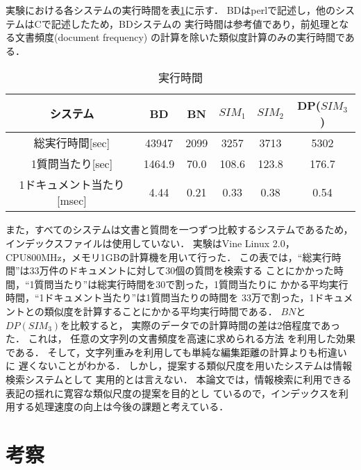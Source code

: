 実験における各システムの実行時間を表\ref{tab:cost}に示す．
BDはperlで記述し，他のシステムはCで記述したため，BDシステムの
実行時間は参考値であり，前処理となる文書頻度(document frequency)
の計算を除いた類似度計算のみの実行時間である．
\begin{table}[h]
\vspace*{-0.5em}
\caption{実行時間}\label{tab:cost}
\vspace*{-1em}
\begin{center}
\hspace*{-2em}
\begin{tabular}{|c||c|c|c|c|c|} \hline
システム & {\bf BD} & {\bf BN} & {\bf $SIM_1$} & {\bf $SIM_2$} & {\bf DP($SIM_3$)}
\\\hline\hline
総実行時間[sec] & 43947 & 2099 & 3257 & 3713 & 5302\\\hline
1質問当たり[sec] & 1464.9 & 70.0 & 108.6 & 123.8 & 176.7\\\hline
1ドキュメント当たり[msec] & 4.44 & 0.21 & 0.33 & 0.38 & 0.54\\\hline
\end{tabular}
\end{center}
\vspace*{-1.5em}
\end{table}
また，すべてのシステムは文書と質問を一つずつ比較するシステムであるため，
インデックスファイルは使用していない．
実験はVine Linux 2.0，CPU800MHz，メモリ1GBの計算機を用いて行った．
この表では，``総実行時間''は33万件のドキュメントに対して30個の質問を検索する
ことにかかった時間，``1質問当たり''は総実行時間を30で割った，1質問当たりに
かかる平均実行時間，``1ドキュメント当たり''は1質問当たりの時間を
33万で割った，1ドキュメントとの類似度を計算することにかかる平均実行時間である．
$BN$と$DP(SIM_3)$を比較すると，
実際のデータでの計算時間の差は2倍程度であった．
これは，
任意の文字列の文書頻度を高速に求められる方法
\cite{Yamamoto98}を利用した効果である．
そして，文字列重みを利用しても単純な編集距離の計算よりも桁違いに
遅くないことがわかる．
しかし，提案する類似尺度を用いたシステムは情報検索システムとして
実用的とは言えない．
本論文では，情報検索に利用できる表記の揺れに寛容な類似尺度の提案を目的とし
ているので，インデックスを利用する処理速度の向上は今後の課題と考えている．

\section{考察}


